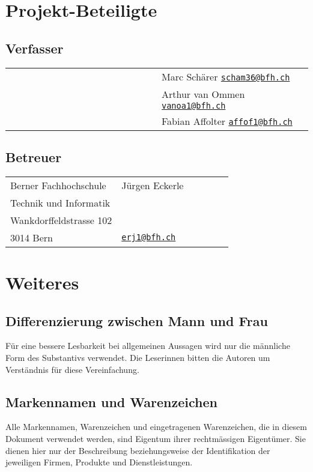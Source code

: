\section{Projekt-Beteiligte}
%
\subsection*{Verfasser}

\begin{tabular}{p{0.5\linewidth}p{0.5\linewidth}}
  & Marc Schärer \href{mailto:scham36@bfh.ch}{\nolinkurl{scham36@bfh.ch}} \\
  & Arthur van Ommen \href{mailto:vanoa1@bfh.ch}{\nolinkurl{vanoa1@bfh.ch}}\\
  & Fabian Affolter \href{mailto:affof11@bfh.ch}{\nolinkurl{affof1@bfh.ch}}\\
\end{tabular}

%
\subsection*{Betreuer}
\begin{tabular}{p{0.5\linewidth}p{0.5\linewidth}}
Berner Fachhochschule &  Jürgen Eckerle \\
Technik und Informatik &  \\
Wankdorffeldstrasse 102 & \\
3014 Bern & \href{mailto:erj1@bfh.ch}{\nolinkurl{erj1@bfh.ch}} \\
\end{tabular}
%
\section{Weiteres}
\subsection*{Differenzierung zwischen Mann und Frau}
Für eine bessere Lesbarkeit bei allgemeinen Aussagen wird nur die männliche Form des Substantivs verwendet. Die Leserinnen bitten die Autoren um Verständnis für diese Vereinfachung.
%
\subsection*{Markennamen und Warenzeichen}
Alle Markennamen, Warenzeichen und eingetragenen Warenzeichen, die in diesem Dokument verwendet werden, sind Eigentum ihrer rechtmässigen Eigentümer. Sie dienen hier nur der Beschreibung beziehungsweise der Identifikation der jeweiligen Firmen, Produkte und Dienstleistungen.
